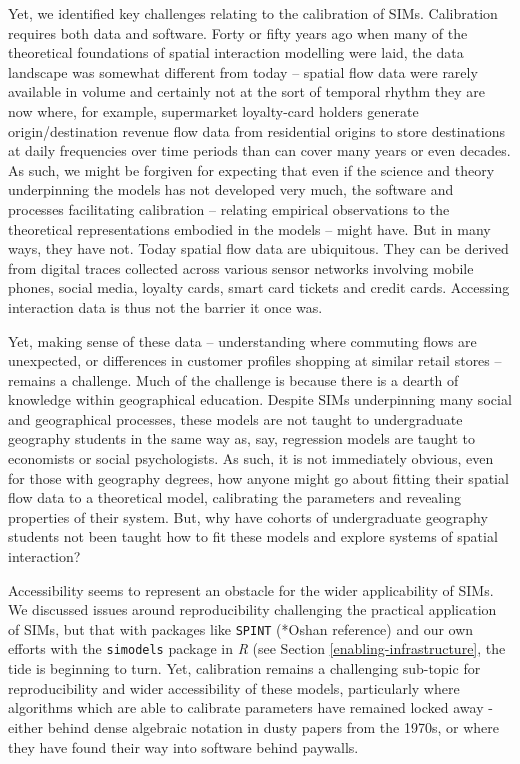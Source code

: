 \documentclass[11pt,letterpaper]{article}
\begin{document}
Yet, we identified key challenges relating to the calibration of SIMs.
Calibration requires both data and software.
Forty or fifty years ago when many of the theoretical foundations of spatial interaction modelling were laid, the data landscape was somewhat different from today -- spatial flow data were rarely available in volume and certainly not at the sort of temporal rhythm they are now where, for example, supermarket loyalty-card holders generate origin/destination revenue flow data from residential origins to store destinations at daily frequencies over time periods than can cover many years or even decades.
As such, we might be forgiven for expecting that even if the science and theory underpinning the models has not developed very much, the software and processes facilitating calibration -- relating empirical observations to the theoretical representations embodied in the models -- might have.
But in many ways, they have not.
Today spatial flow data are ubiquitous.
They can be derived from digital traces collected across various sensor networks involving mobile phones, social media, loyalty cards, smart card tickets and credit cards.
Accessing interaction data is thus not the barrier it once was.

Yet, making sense of these data -- understanding where commuting flows are unexpected, or differences in customer profiles shopping at similar retail stores -- remains a challenge.
Much of the challenge is because there is a dearth of knowledge within geographical education.
Despite SIMs underpinning many social and geographical processes, these models are not taught to undergraduate geography students in the same way as, say, regression models are taught to economists or social psychologists.
As such, it is not immediately obvious, even for those with geography degrees, how anyone might go about fitting their spatial flow data to a theoretical model, calibrating the parameters and revealing properties of their system.
But, why have cohorts of undergraduate geography students not been taught how to fit these models and explore systems of spatial interaction?

Accessibility seems to represent an obstacle for the wider applicability of SIMs.
We discussed issues around reproducibility challenging the practical application of SIMs, but that with packages like \texttt{SPINT} (*Oshan reference) and our own efforts with the \texttt{simodels} package in \emph{R} (see Section \ref{enabling-infrastructure}, the tide is beginning to turn.
Yet, calibration remains a challenging sub-topic for reproducibility and wider accessibility of these models, particularly where algorithms which are able to calibrate parameters have remained locked away - either behind dense algebraic notation in dusty papers from the 1970s, or where they have found their way into software behind paywalls.
\end{document}
